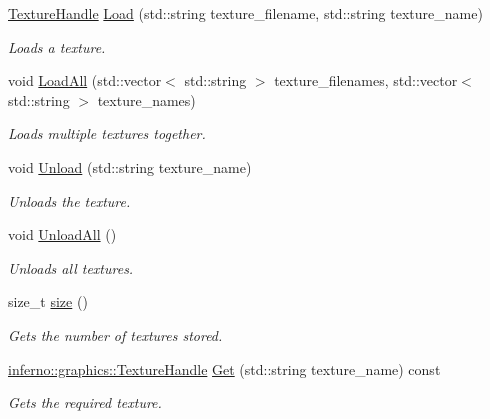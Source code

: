 \begin{DoxyCompactItemize}
\mbox{\hyperlink{namespaceinferno_1_1graphics_a9d719bfbfedd17b9ace9b8d603ab5a38}{Texture\+Handle}} \mbox{\hyperlink{classinferno_1_1graphics_1_1_texture_manager_a12be034ff8a7782ae575d0a2b71a361d}{Load}} (std\+::string texture\+\_\+filename, std\+::string texture\+\_\+name)
\begin{DoxyCompactList}\small\item\em Loads a texture. \end{DoxyCompactList}\item 
void \mbox{\hyperlink{classinferno_1_1graphics_1_1_texture_manager_ae1c0a268b96073bb0c925e3523f2bc58}{Load\+All}} (std\+::vector$<$ std\+::string $>$ texture\+\_\+filenames, std\+::vector$<$ std\+::string $>$ texture\+\_\+names)
\begin{DoxyCompactList}\small\item\em Loads multiple textures together. \end{DoxyCompactList}\item 
void \mbox{\hyperlink{classinferno_1_1graphics_1_1_texture_manager_af860bd092645a0c99afa35d3e978f3d8}{Unload}} (std\+::string texture\+\_\+name)
\begin{DoxyCompactList}\small\item\em Unloads the texture. \end{DoxyCompactList}\item 
void \mbox{\hyperlink{classinferno_1_1graphics_1_1_texture_manager_ab3f3fbf66a7c133ed129e1433b1c7cee}{Unload\+All}} ()
\begin{DoxyCompactList}\small\item\em Unloads all textures. \end{DoxyCompactList}\item 
size\+\_\+t \mbox{\hyperlink{classinferno_1_1graphics_1_1_texture_manager_a7b5b7ee8f6c1a65f63de017a933549ef}{size}} ()
\begin{DoxyCompactList}\small\item\em Gets the number of textures stored. \end{DoxyCompactList}\item 
\mbox{\hyperlink{namespaceinferno_1_1graphics_a9d719bfbfedd17b9ace9b8d603ab5a38}{inferno\+::graphics\+::\+Texture\+Handle}} \mbox{\hyperlink{classinferno_1_1graphics_1_1_texture_manager_ae2b18c9725addce31e35034ea6642fbf}{Get}} (std\+::string texture\+\_\+name) const
\begin{DoxyCompactList}\small\item\em Gets the required texture. \end{DoxyCompactList}\item 

\end{DoxyCompactItemize}
